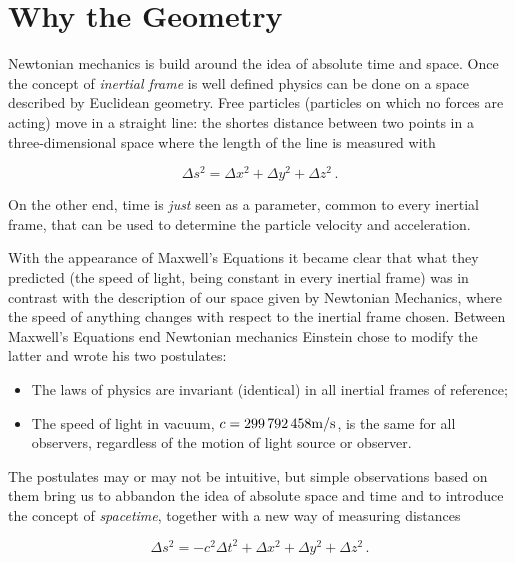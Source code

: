 \section{Why the \Sh{} Geometry}

Newtonian mechanics is build around the idea of absolute time and space.
Once the concept of \textit{inertial frame} is well defined physics can be done on a space described by Euclidean geometry.
Free particles (particles on which no forces are acting) move in a straight line:
the shortes distance between two points in a three-dimensional space where the length of the line is measured with 

\begin{equation}
    \Delta s^2 = \Delta x^2 + \Delta y^2 + \Delta z^2 \, .
    \label{eq:euclide}
\end{equation}

On the other end, time is \textit{just} seen as a parameter, common to every inertial frame,
that can be used to determine the particle velocity and acceleration.

With the appearance of Maxwell's Equations it became clear that what they predicted (the speed of light,
being constant in every inertial frame) was in contrast with the description of our space given by Newtonian Mechanics,
where the speed of anything changes with respect to the inertial frame chosen.
Between Maxwell's Equations end Newtonian mechanics Einstein chose to modify the latter and wrote his two postulates:

\begin{itemize}
    \item The laws of physics are invariant (identical) in all inertial frames of reference;
    \item The speed of light in vacuum, $c = \num{299792458} \unit[per-mode = symbol]{\meter\per\second}$, is the same for all observers, regardless of the motion of light source or observer.
\end{itemize}

The postulates may or may not be intuitive, but simple observations based on them bring us to abbandon the idea
of absolute space and time and to introduce the concept of \textit{spacetime},
together with a new way of measuring distances

\begin{equation}
    \Delta s^2 = - c^2 \Delta t^2 + \Delta x^2 + \Delta y^2 + \Delta z^2 \, .
    \label{eq:Minkowski}
\end{equation}

